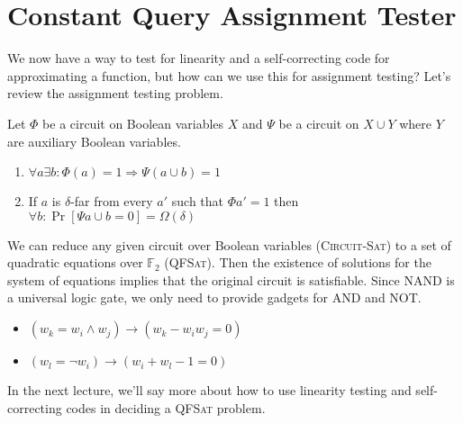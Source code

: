 \documentclass[12pt]{article}
\begin{document}
\section{Constant Query Assignment Tester}

We now have a way to test for linearity and a self-correcting code for
approximating a function, but how can we use this for
assignment testing? Let's review the assignment testing problem.

Let $\Phi$ be a circuit on Boolean variables $X$ and $\Psi$ be a circuit
on $X \cup Y$ where $Y$ are auxiliary Boolean variables.

\begin{remark}
\begin{enumerate}
\item
$\forall{a}\exists{b}: \Phi(a) = 1 \Rightarrow \Psi(a \cup b) = 1$
\item
If $a$ is $\delta$-far from every $a'$ such that $\Phi{a'} = 1$ then
$\forall{b}: \Pr{\left[\Psi{a \cup b} = 0\right]} = \Omega(\delta)$
\end{enumerate}
\end{remark}

We can reduce any given circuit over Boolean variables (\textsc{Circuit-Sat})
to a set of quadratic equations over $\mathbb{F}_2$ (\textsc{QFSat}).
 Then the
existence of solutions for the system of equations implies that the
original circuit is satisfiable. Since NAND is a universal logic gate,
we only need to provide gadgets for AND and NOT.

\begin{itemize}
\item
$\left( w_k = w_i \land w_j \right) \rightarrow \left(w_k - w_i w_j = 0\right)$
\item
$\left( w_l = \lnot w_i \right) \rightarrow \left(w_i + w_l - 1 = 0\right)$
\end{itemize}

In the next lecture, we'll say more about how to use linearity testing and
self-correcting codes in deciding a \textsc{QFSat} problem.
\end{document}
